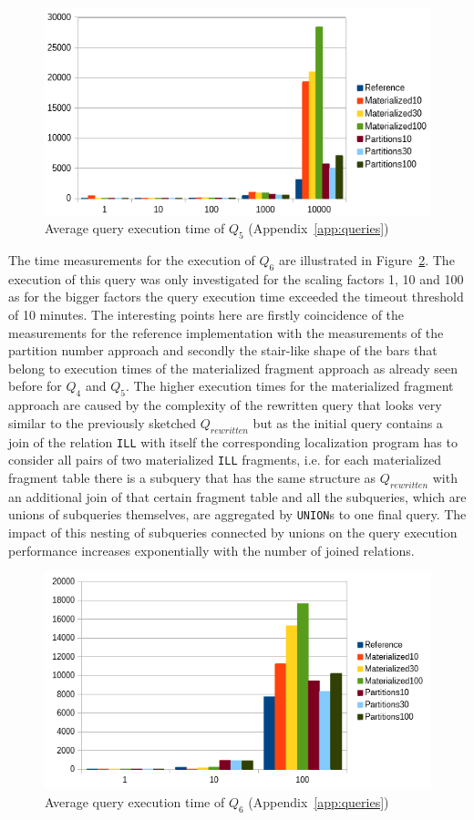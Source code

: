\begin{figure}[h]
    \centering
    \includegraphics[scale=0.8]{charts/Query5.png}
    \caption{Average query execution time of $Q_5$ (Appendix~\ref{app:queries})}
    \label{fig:query5}
\end{figure}



The time measurements for the execution of $Q_6$ are illustrated in Figure~\ref{fig:query6}. The execution of this query was only investigated for the scaling 
factors 1, 10 and 100 as for the bigger factors the query execution time exceeded the timeout threshold of 10 minutes. The interesting points here are firstly
coincidence of the measurements for the reference implementation with the measurements of the partition number approach and secondly the stair-like shape of
the bars that belong to execution times of the materialized fragment approach as already seen before for $Q_4$ and $Q_5$. The higher execution times for the
materialized fragment approach are caused by the complexity of the rewritten query that looks very similar to the previously sketched $Q_{rewritten}$ but as the
initial query contains a join of the relation \verb!ILL! with itself the corresponding localization program has to consider all pairs of two materialized
\verb!ILL! fragments, i.e. for each materialized fragment table there is a subquery that has the same structure as $Q_{rewritten}$ with an additional join of
that certain fragment table and all the subqueries, which are unions of subqueries themselves, are aggregated by \verb!UNION!s to one final query. The impact of
this nesting of subqueries connected by unions on the query execution performance increases exponentially with the number of joined relations.

\begin{figure}[h]
    \centering
    \includegraphics[scale=0.8]{charts/Query6.png}
    \caption{Average query execution time of $Q_6$ (Appendix~\ref{app:queries})}
    \label{fig:query6}
\end{figure}


